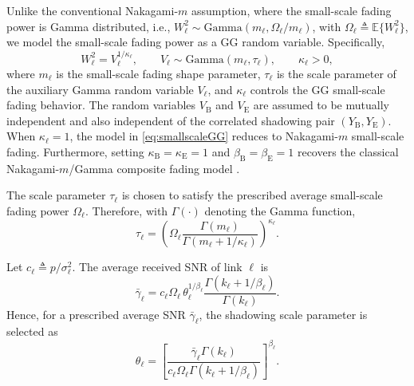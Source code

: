 \documentclass[lettersize,journal]{IEEEtran}
\begin{document}
Unlike the conventional Nakagami-\(m\) assumption, where the small-scale fading power is Gamma distributed, i.e., \(W_\ell^2\sim\mathrm{Gamma}(m_\ell,\Omega_\ell/m_\ell)\), with \(\Omega_\ell\triangleq\mathbb{E}\{W_\ell^2\}\), we model the small-scale fading power as a GG random variable. Specifically,
\begin{equation}
    W_\ell^2 = V_\ell^{1/\kappa_\ell},\qquad
    V_\ell\sim \mathrm{Gamma}(m_\ell,\tau_\ell),\qquad
    \kappa_\ell>0,
    \label{eq:smallscaleGG}
\end{equation}
where \(m_\ell\) is the small-scale fading shape parameter, \(\tau_\ell\) is the scale parameter of the auxiliary Gamma random variable \(V_\ell\), and \(\kappa_\ell\) controls the GG small-scale fading behavior. The random variables \(V_{\mathrm B}\) and \(V_{\mathrm E}\) are assumed to be mutually independent and also independent of the correlated shadowing pair \((Y_{\mathrm B},Y_{\mathrm E})\). When \(\kappa_\ell=1\), the model in \eqref{eq:smallscaleGG} reduces to Nakagami-\(m\) small-scale fading. Furthermore, setting \(\kappa_{\mathrm B}=\kappa_{\mathrm E}=1\) and \(\beta_{\mathrm B}=\beta_{\mathrm E}=1\) recovers the classical Nakagami-\(m\)/Gamma composite fading model \cite{8060499}.

The scale parameter \(\tau_\ell\) is chosen to satisfy the prescribed average small-scale fading power \(\Omega_\ell\). Therefore, with \(\Gamma(\cdot)\) denoting the Gamma function,
\begin{equation}
\tau_\ell =
\left(
\Omega_\ell
\frac{\Gamma(m_\ell)}
{\Gamma(m_\ell+1/\kappa_\ell)}
\right)^{\kappa_\ell}.
\label{eq:tautomean}
\end{equation}

Let \(c_\ell\triangleq p/\sigma_\ell^2\). The average received SNR
of link \(\ell\) is
\begin{equation}
\bar{\gamma}_\ell
=
c_\ell\Omega_\ell\,
\theta_\ell^{1/\beta_\ell}
\frac{\Gamma\!\left(k_\ell+1/\beta_\ell\right)}
{\Gamma(k_\ell)}.
\label{eq:average_snr}
\end{equation}
Hence, for a prescribed average SNR \(\bar{\gamma}_\ell\), the
shadowing scale parameter is selected as
\begin{equation}
\theta_\ell
=
\left[
\frac{\bar{\gamma}_\ell\Gamma(k_\ell)}
{c_\ell\Omega_\ell
\Gamma\!\left(k_\ell+1/\beta_\ell\right)}
\right]^{\beta_\ell}.
\label{eq:theta_from_snr}
\end{equation}
\end{document}
